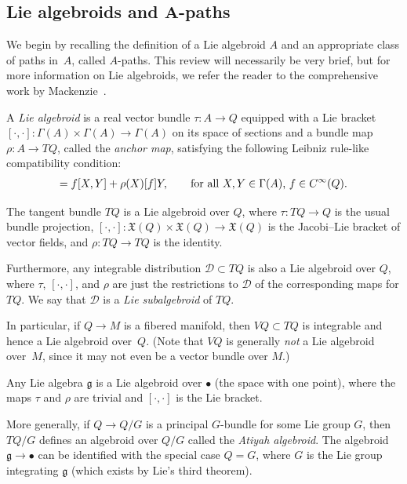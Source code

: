 \documentclass[pdftex]{sigma}
\numberwithin{equation}{section}
\begin{document}
\subsection[Lie algebroids and $A$-paths]{Lie algebroids and $\boldsymbol{A}$-paths}

We begin by recalling the def\/inition of a Lie algebroid $A$ and an appropriate class of paths in~$A$, called $A$-paths. This review will necessarily be very brief, but for more information on Lie algebroids, we refer the reader to the comprehensive work by Mackenzie~\cite{Mackenzie2005}.

\begin{Definition} A \emph{Lie algebroid} is a real vector bundle $ \tau \colon A \rightarrow Q $ equipped with a Lie bracket $ [ \cdot , \cdot ] \colon \Gamma (A) \times \Gamma (A) \rightarrow \Gamma (A) $ on its space of sections and a bundle map $ \rho \colon A \rightarrow T Q $, called the \emph{anchor map}, satisfying the following Leibniz rule-like compatibility condition:
 \begin{gather*}
 [ X, f Y ] = f [X, Y] + \rho (X) [f] Y, \qquad \text{for all $ X, Y \in \Gamma (A) $, $ f \in C ^\infty (Q) $}.
 \end{gather*}
\end{Definition}

\begin{Example} \label{ex:tangentAlgebroid}
The tangent bundle $ T Q $ is a Lie algebroid over $Q$, where $ \tau \colon T Q \rightarrow Q $ is the usual bundle projection, $ [ \cdot, \cdot ] \colon \mathfrak{X} (Q) \times \mathfrak{X} (Q) \rightarrow \mathfrak{X} (Q) $ is the Jacobi--Lie bracket of vector f\/ields, and $ \rho \colon T Q \rightarrow T Q $ is the identity.

Furthermore, any integrable distribution $ \mathcal{D} \subset T Q $ is also a Lie algebroid over $Q$, where $ \tau $, $ [ \cdot , \cdot ] $, and $ \rho $ are just the restrictions to $\mathcal{D}$ of the corresponding maps for $ T Q $. We say that $\mathcal{D}$ is a \emph{Lie subalgebroid} of $ T Q $.

In particular, if $Q \rightarrow M $ is a f\/ibered manifold, then $ V Q \subset T Q $ is integrable and hence a Lie algebroid over~$Q$. (Note that $ V Q $ is generally \emph{not} a Lie algebroid over~$M$, since it may not even be a vector bundle over $M$.)
\end{Example}

\begin{Example} Any Lie algebra $ \mathfrak{g} $ is a Lie algebroid over $ \bullet $ (the space with one point), where the maps $\tau$ and $\rho$ are trivial and $ [ \cdot , \cdot ] $ is the Lie bracket.

More generally, if $ Q \rightarrow Q/G $ is a principal $G$-bundle for some Lie group $G$, then $ T Q / G $ def\/ines an algebroid over $ Q / G $ called the \emph{Atiyah algebroid}. The algebroid $ \mathfrak{g} \rightarrow \bullet $ can be identif\/ied with the special case $ Q = G $, where $G$ is the Lie group integrating $ \mathfrak{g} $ (which exists by Lie's third theorem).
\end{Example}
\end{document}
